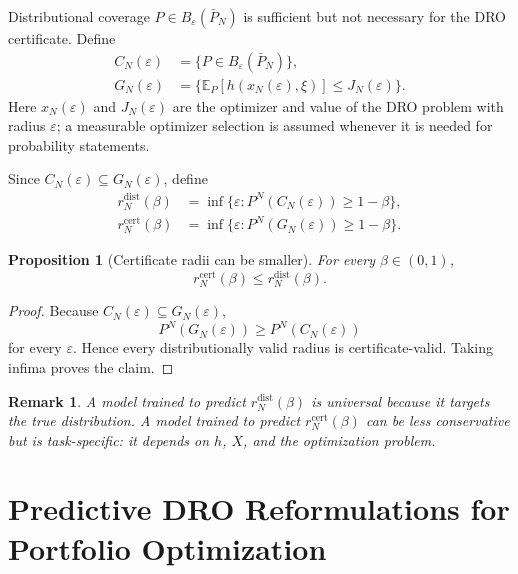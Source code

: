 \documentclass[11pt]{article}
\newtheorem{proposition}[theorem]{Proposition}
\newtheorem{remark}[theorem]{Remark}
\newcommand{\E}{\mathbb{E}}
\newcommand{\1}{\mathbf{1}}
\newcommand{\Pbar}{\bar P_N}
\newcommand{\rcert}{r_N^{\mathrm{cert}}}
\newcommand{\rdist}{r_N^{\mathrm{dist}}}
\begin{document}
Distributional coverage $P\in B_\varepsilon(\Pbar)$ is sufficient but not necessary for the DRO certificate. Define
\begin{align}
C_N(\varepsilon)&=\{P\in B_\varepsilon(\Pbar)\},\\
G_N(\varepsilon)&=\{\E_P[h(x_N(\varepsilon),\xi)]\le J_N(\varepsilon)\}.
\end{align}
Here $x_N(\varepsilon)$ and $J_N(\varepsilon)$ are the optimizer and value of the DRO problem with radius $\varepsilon$; a measurable optimizer selection is assumed whenever it is needed for probability statements.

Since $C_N(\varepsilon)\subseteq G_N(\varepsilon)$, define
\begin{align}
\rdist(\beta)&=\inf\{\varepsilon:P^N(C_N(\varepsilon))\ge1-\beta\},\\
\rcert(\beta)&=\inf\{\varepsilon:P^N(G_N(\varepsilon))\ge1-\beta\}.
\end{align}

\begin{proposition}[Certificate radii can be smaller]\label{prop:cert-radius}
For every $\beta\in(0,1)$,
\begin{equation}
    \rcert(\beta)\le\rdist(\beta).
\end{equation}
\end{proposition}

\begin{proof}
Because $C_N(\varepsilon)\subseteq G_N(\varepsilon)$,
\begin{equation}
    P^N(G_N(\varepsilon))\ge P^N(C_N(\varepsilon))
\end{equation}
for every $\varepsilon$. Hence every distributionally valid radius is certificate-valid. Taking infima proves the claim.
\end{proof}

\begin{remark}
A model trained to predict $\rdist(\beta)$ is universal because it targets the true distribution. A model trained to predict $\rcert(\beta)$ can be less conservative but is task-specific: it depends on $h$, $X$, and the optimization problem.
\end{remark}

\section{Predictive DRO Reformulations for Portfolio Optimization}\label{sec:portfolio-reform}
\end{document}
